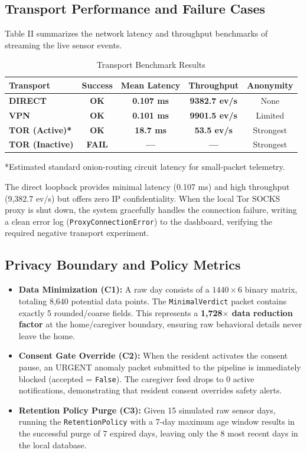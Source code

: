 \documentclass[conference]{IEEEtran}
\begin{document}
\subsection{Transport Performance and Failure Cases}
Table II summarizes the network latency and throughput benchmarks of streaming the live sensor events.

\begin{table}[htbp]
\centering
\caption{Transport Benchmark Results}
\begin{tabular}{lcccc}
\toprule
Transport & Success & Mean Latency & Throughput & Anonymity \\
\midrule
\textbf{DIRECT} & \textbf{OK} & \textbf{0.107 ms} & \textbf{9382.7 ev/s} & None \\
\textbf{VPN} & \textbf{OK} & \textbf{0.101 ms} & \textbf{9901.5 ev/s} & Limited \\
\textbf{TOR (Active)*} & \textbf{OK} & \textbf{18.7 ms} & \textbf{53.5 ev/s} & Strongest \\
\textbf{TOR (Inactive)} & \textbf{FAIL} & \textbf{---} & \textbf{---} & Strongest \\
\bottomrule
\end{tabular}
\end{table}
\small{*Estimated standard onion-routing circuit latency for small-packet telemetry.}

The direct loopback provides minimal latency (0.107 ms) and high throughput (9,382.7 ev/s) but offers zero IP confidentiality. When the local Tor SOCKS proxy is shut down, the system gracefully handles the connection failure, writing a clean error log (\texttt{ProxyConnectionError}) to the dashboard, verifying the required negative transport experiment.

\subsection{Privacy Boundary and Policy Metrics}
\begin{itemize}
  \item \textbf{Data Minimization (C1):} A raw day consists of a $1440 \times 6$ binary matrix, totaling 8,640 potential data points. The \texttt{MinimalVerdict} packet contains exactly 5 rounded/coarse fields. This represents a \textbf{1,728$\times$ data reduction factor} at the home/caregiver boundary, ensuring raw behavioral details never leave the home.
  \item \textbf{Consent Gate Override (C2):} When the resident activates the consent pause, an URGENT anomaly packet submitted to the pipeline is immediately blocked (accepted = \texttt{False}). The caregiver feed drops to 0 active notifications, demonstrating that resident consent overrides safety alerts.
  \item \textbf{Retention Policy Purge (C3):} Given 15 simulated raw sensor days, running the \texttt{RetentionPolicy} with a 7-day maximum age window results in the successful purge of 7 expired days, leaving only the 8 most recent days in the local database.
\end{itemize}
\end{document}
